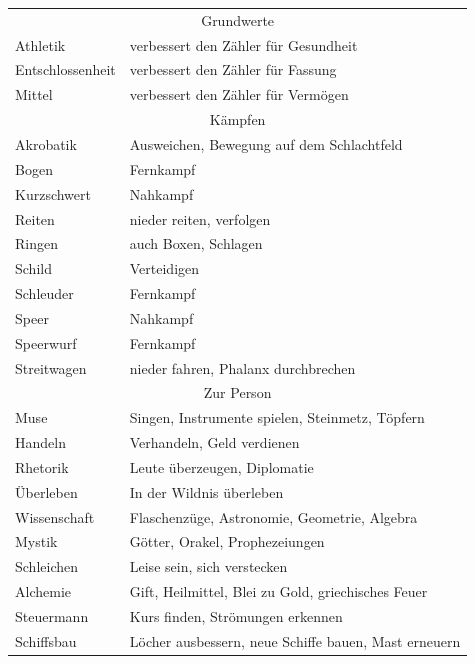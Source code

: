 \documentclass{tufte-handout}
\begin{document}
\begin{tabular}{ll}
\multicolumn{2}{c}{Grundwerte}                                          \\
Athletik         & verbessert den Zähler für Gesundheit                 \\
Entschlossenheit & verbessert den Zähler für Fassung                    \\
Mittel           & verbessert den Zähler für Vermögen                   \\
\midrule[0pt]
\multicolumn{2}{c}{Kämpfen}                                             \\
Akrobatik        & Ausweichen, Bewegung auf dem Schlachtfeld            \\
Bogen            & Fernkampf                                            \\
Kurzschwert      & Nahkampf                                             \\
Reiten           & nieder reiten, verfolgen                             \\
Ringen           & auch Boxen, Schlagen                                 \\
Schild           & Verteidigen                                          \\
Schleuder        & Fernkampf                                            \\
Speer            & Nahkampf                                             \\
Speerwurf        & Fernkampf                                            \\
Streitwagen      & nieder fahren, Phalanx durchbrechen                  \\
\midrule[0pt]
\multicolumn{2}{c}{Zur Person}                                          \\
Muse             & Singen, Instrumente spielen, Steinmetz, Töpfern      \\
Handeln          & Verhandeln, Geld verdienen                           \\
Rhetorik         & Leute überzeugen, Diplomatie                         \\
Überleben        & In der Wildnis überleben                             \\
Wissenschaft     & Flaschenzüge, Astronomie, Geometrie, Algebra         \\
Mystik           & Götter, Orakel, Prophezeiungen                       \\
Schleichen       & Leise sein, sich verstecken                          \\
Alchemie         & Gift, Heilmittel, Blei zu Gold, griechisches Feuer   \\
Steuermann       & Kurs finden, Strömungen erkennen                     \\
Schiffsbau       & Löcher ausbessern, neue Schiffe bauen, Mast erneuern \\
\end{tabular}
\end{document}

